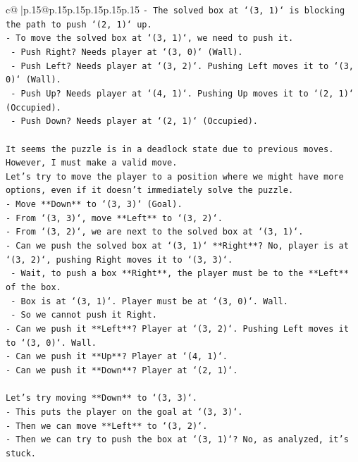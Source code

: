\documentclass{article}
\begin{document}
{\begin{supertabular}{c@{$\;$}|p{.15\linewidth}@{}p{.15\linewidth}p{.15\linewidth}p{.15\linewidth}p{.15\linewidth}p{.15\linewidth}}
{{{\texttt{{-} The solved box at `(3, 1)` is blocking the path to push `(2, 1)` up.} \\
\texttt{{-} To move the solved box at `(3, 1)`, we need to push it.} \\
\texttt{  {-} Push Right? Needs player at `(3, 0)` (Wall).} \\
\texttt{  {-} Push Left? Needs player at `(3, 2)`. Pushing Left moves it to `(3, 0)` (Wall).} \\
\texttt{  {-} Push Up? Needs player at `(4, 1)`. Pushing Up moves it to `(2, 1)` (Occupied).} \\
\texttt{  {-} Push Down? Needs player at `(2, 1)` (Occupied).} \\
\\ 
\texttt{It seems the puzzle is in a deadlock state due to previous moves. However, I must make a valid move.} \\
\texttt{Let's try to move the player to a position where we might have more options, even if it doesn't immediately solve the puzzle.} \\
\texttt{{-} Move **Down** to `(3, 3)` (Goal).} \\
\texttt{{-} From `(3, 3)`, move **Left** to `(3, 2)`.} \\
\texttt{{-} From `(3, 2)`, we are next to the solved box at `(3, 1)`.} \\
\texttt{{-} Can we push the solved box at `(3, 1)` **Right**? No, player is at `(3, 2)`, pushing Right moves it to `(3, 3)`.} \\
\texttt{  {-} Wait, to push a box **Right**, the player must be to the **Left** of the box.} \\
\texttt{  {-} Box is at `(3, 1)`. Player must be at `(3, 0)`. Wall.} \\
\texttt{  {-} So we cannot push it Right.} \\
\texttt{{-} Can we push it **Left**? Player at `(3, 2)`. Pushing Left moves it to `(3, 0)`. Wall.} \\
\texttt{{-} Can we push it **Up**? Player at `(4, 1)`.} \\
\texttt{{-} Can we push it **Down**? Player at `(2, 1)`.} \\
\\ 
\texttt{Let's try moving **Down** to `(3, 3)`.} \\
\texttt{{-} This puts the player on the goal at `(3, 3)`.} \\
\texttt{{-} Then we can move **Left** to `(3, 2)`.} \\
\texttt{{-} Then we can try to push the box at `(3, 1)`? No, as analyzed, it's stuck.} \\
}}}
\end{supertabular}}
\end{document}
